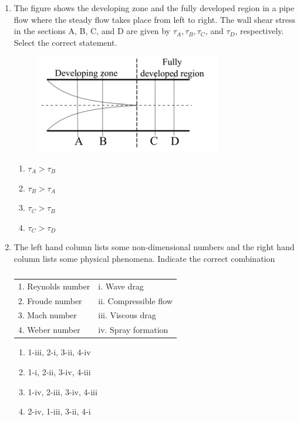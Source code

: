 \documentclass[a4paper,10pt]{article}
\begin{document}
\begin{enumerate}
\item The figure shows the developing zone and the fully developed region in a pipe flow where the steady flow takes place from left to right. The wall shear stress in the sections A, B, C, and D are given by $\tau_A, \tau_B, \tau_C$, and $\tau_D$, respectively. Select the correct statement.
\begin{figure}[H]
    \centering
    \includegraphics[width=0.6\columnwidth]{q23.png}
    \caption*{}
    \label{fig:q23}
\end{figure}

\hfill{}
\begin{enumerate}
    \item $\tau_A > \tau_B$
    \item $\tau_B > \tau_A$
    \item $\tau_C > \tau_B$
    \item $\tau_C > \tau_D$
\end{enumerate}

\item The left hand column lists some non-dimensional numbers and the right hand column lists some physical phenomena. Indicate the correct combination
\begin{table}[h]
    \centering
    \begin{tabular}{|l|l|}
    \hline
    1. Reynolds number & i. Wave drag \\
    2. Froude number & ii. Compressible flow \\
    3. Mach number & iii. Viscous drag \\
    4. Weber number & iv. Spray formation \\
    \hline
    \end{tabular}
    \caption*{}
    \label{tab:q24}
\end{table}

\hfill{}
\begin{enumerate}
    \item 1-iii, 2-i, 3-ii, 4-iv
    \item 1-i, 2-ii, 3-iv, 4-iii
    \item 1-iv, 2-iii, 3-iv, 4-iii
    \item 2-iv, 1-iii, 3-ii, 4-i
\end{enumerate}


\end{enumerate}
\end{document}
